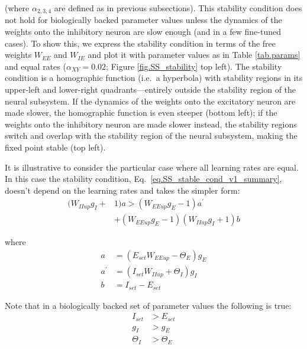 \documentclass[twocolumn]{article}
\newcommand{\EE}{\mathit{EE}}
\newcommand{\IE}{\mathit{IE}}
\newcommand{\II}{\mathit{II}}
\newcommand{\XY}{\mathit{XY}}
\newcommand{\set}{\mathit{set}}
\newcommand{\up}{\mathit{up}}
\begin{document}
\noindent (where $\alpha_{2,3,4}$ are defined as in previous subsections). This stability condition does not hold for biologically backed parameter values unless the dynamics of the weights onto the inhibitory neuron are slow enough (and in a few fine-tuned cases). To show this, we express the stability condition in terms of the free weights $W_{\EE}$ and $W_{\IE}$ and plot it with parameter values as in Table \ref{tab.params} and equal rates ($\alpha_{\XY}=0.02$; Figure \ref{fig.SS_stability} top left). The stability condition is a homographic function (i.e.\ a hyperbola) with stability regions in its upper-left and lower-right quadrants---entirely outside the stability region of the neural subsystem. If the dynamics of the weights onto the excitatory neuron are made slower, the homographic function is even steeper (bottom left); if the weights onto the inhibitory neuron are made slower instead, the stability regions switch and overlap with the stability region of the neural subsystem, making the fixed point stable (top left).

It is illustrative to consider the particular case where all learning rates are equal. In this case the stability condition, Eq.\ \ref{eq.SS_stable_cond_v1_summary}, doesn't depend on the learning rates and takes the simpler form:
\begin{equation}
\begin{aligned}
(W_{\II\up} g_I + & 1)a > (W_{\EE\up} g_E - 1)a^\prime \\
& + (W_{\EE\up} g_E - 1)(W_{\II\up} g_I + 1)b
\end{aligned}
\label{eq.SS_stable_cond_v2_summary}
\end{equation}

\noindent where
\begin{displaymath}
\begin{aligned}
a & = (E_{\set} W_{\EE\up} - \Theta_E)g_E \\
a^\prime & = (I_{\set} W_{\II\up} + \Theta_I)g_I \\
b & = I_{\set} - E_{\set}
\end{aligned}
\end{displaymath}

\noindent Note that in a biologically backed set of parameter values the following is true:
\begin{displaymath}
\begin{aligned}
I_{\set} & > E_{\set} \\
g_I & > g_E \\
\Theta_I & > \Theta_E
\end{aligned}
\end{displaymath}
\end{document}
